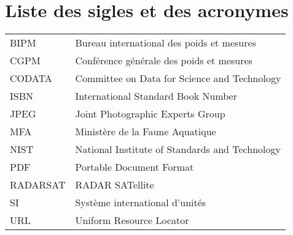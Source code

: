 
%
%

\chapter{Liste des sigles et des acronymes}


\begin{flushleft}
   \begin{tabular}{@{}ll}
      BIPM        & Bureau international des poids et mesures        \\
      CGPM        & Conférence générale des poids et mesures         \\
      CODATA      & Committee on Data for Science and Technology     \\
      ISBN        & International Standard Book Number               \\
      JPEG        & Joint Photographic Experts Group                 \\
      MFA & Ministère de la Faune Aquatique \\
      NIST        & National Institute of Standards and Technology   \\
      PDF         & Portable Document Format                         \\
      RADARSAT    & RADAR SATellite                                  \\
      SI          & Système international d'unités                   \\
      URL         & Uniform Resource Locator                         \\
   \end{tabular}
\end{flushleft}






